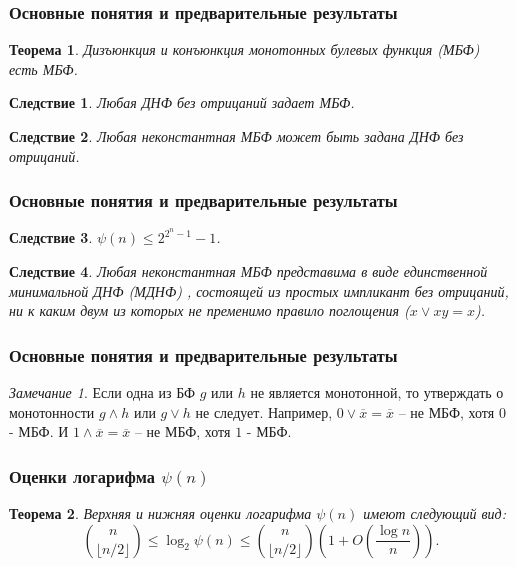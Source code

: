 \documentclass[14pt]{beamer}
\theoremstyle{plain} %
\newtheorem{Theore}{Теорема}
\newtheorem{Corollar}{Следствие}
\theoremstyle{remark}
\newtheorem{Remark}{Замечание}
\begin{document}
\begin{frame}
\frametitle{Основные понятия и предварительные результаты}
\begin{Theore} 
Дизъюнкция и конъюнкция монотонных булевых функция (МБФ) есть МБФ.
\end{Theore}
\begin{Corollar}
    Любая ДНФ без отрицаний задает МБФ.
  \end{Corollar}
    
  \begin{Corollar}
    Любая неконстантная МБФ может быть задана ДНФ без отрицаний.
  \end{Corollar}
   
\end{frame}

\begin{frame}
\frametitle{Основные понятия и предварительные результаты}
\begin{Corollar}
    $\psi(n) \leq 2^{2^n-1}-1$.
  \end{Corollar}
 
  \begin{Corollar}
    
    Любая неконстантная МБФ представима в виде единственной
    минимальной ДНФ (МДНФ) , состоящей из простых импликант без отрицаний, 
    ни к каким двум из которых не пременимо правило поглощения 
    ($x \vee xy = x$).
  \end{Corollar}
  
\end{frame}


\begin{frame}
\frametitle{Основные понятия и предварительные результаты}
\begin{Remark}
    Если одна из БФ $g$ или $h$ не является монотонной, то утверждать о монотонности 
    $g \wedge h$ или $g \vee h$ не следует.
    Например, $0 \vee \overline{x} = \overline{x}$ -- не МБФ, хотя $0$ - МБФ.
    И $1 \wedge \overline{x} = \overline{x}$ -- не МБФ, хотя $1$ - МБФ.
   \end{Remark}
   
\end{frame}

\begin{frame}
\frametitle{Оценки логарифма $\psi(n)$}
   \begin{Theore}
    Верхняя и нижняя оценки логарифма $\psi(n)$ имеют следующий вид:
    $${n\choose \lfloor n/2\rfloor}\le \log_2 \psi(n)\le {n\choose \lfloor n/2\rfloor}\left(1+O\left(\frac{\log n}{n}\right)\right).$$
   \end{Theore}
\end{frame}
\end{document}
